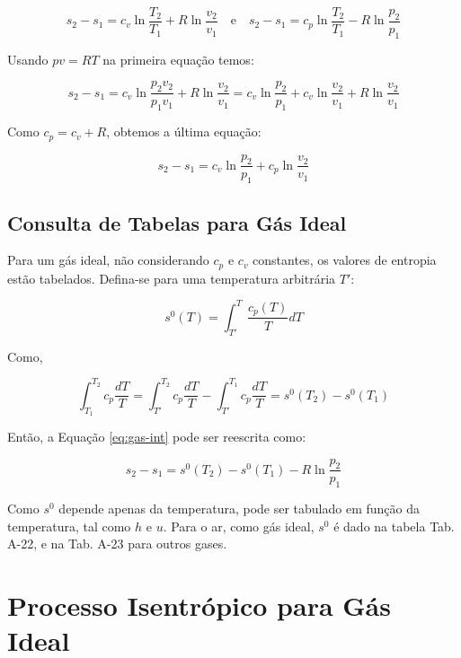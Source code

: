 \begin{equation}
    s_2 - s_1 = c_v \ln \frac{T_2}{T_1} + R \ln \frac{v_2}{v_1} \quad \text{e} \quad s_2 - s_1 = c_p \ln \frac{T_2}{T_1} - R \ln \frac{p_2}{p_1}
\end{equation}

Usando $pv = RT$ na primeira equação temos:

\begin{equation*}
    s_2 - s_1 = c_v \ln \frac{p_2 v_2}{p_1 v_1} + R \ln \frac{v_2}{v_1} = c_v \ln \frac{p_2}{p_1} + c_v \ln \frac{v_2}{v_1} + R \ln \frac{v_2}{v_1}
\end{equation*}

Como $c_p = c_v + R$, obtemos a última equação:

\begin{equation} \label{eq:cpcv}
    s_2 - s_1 = c_v \ln \frac{p_2}{p_1} + c_p \ln \frac{v_2}{v_1} 
\end{equation}

\subsection{Consulta de Tabelas para Gás Ideal}

Para um gás ideal, não considerando $c_p$ e $c_v$ constantes, os valores de entropia estão tabelados. Defina-se para uma temperatura arbitrária $T'$:

\begin{equation}
    s^0(T) = \int_{T'}^T \frac{c_p(T)}{T} dT
\end{equation}

Como,

\begin{equation*}
    \int_{T_1}^{T_2} c_p \frac{dT}{T} = \int_{T'}^{T_2} c_p \frac{dT}{T} - \int_{T'}^{T_1} c_p \frac{dT}{T} = s^0(T_2) - s^0(T_1)
\end{equation*}

Então, a Equação \ref{eq:gas-int} pode ser reescrita como:

\begin{equation} \label{eq:s0}
    s_2 - s_1 = s^0(T_2) - s^0(T_1) - R \ln \frac{p_2}{p_1}
\end{equation}

Como $s^0$ depende apenas da temperatura, pode ser tabulado em função da temperatura, tal como $h$ e $u$. Para o ar, como gás ideal, $s^0$ é dado na tabela Tab. A-22, e na Tab. A-23 para outros gases.

\section{Processo Isentrópico para Gás Ideal}

